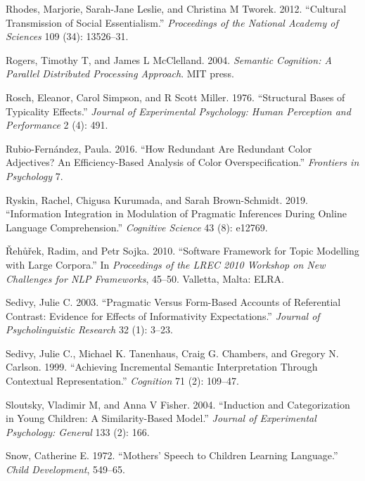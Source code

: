 \documentclass{ucetd}
\newlength{\cslhangindent}
\newenvironment{cslreferences}%
{\setlength{\parindent}{0pt}%
\everypar{\setlength{\hangindent}{\cslhangindent}}\ignorespaces}%
{\par}
\begin{document}
\begin{cslreferences}
\leavevmode\hypertarget{ref-rhodes2012}{}%
Rhodes, Marjorie, Sarah-Jane Leslie, and Christina M Tworek. 2012.
``Cultural Transmission of Social Essentialism.'' \emph{Proceedings of
the National Academy of Sciences} 109 (34): 13526--31.

\leavevmode\hypertarget{ref-rogers2004}{}%
Rogers, Timothy T, and James L McClelland. 2004. \emph{Semantic
Cognition: A Parallel Distributed Processing Approach}. MIT press.

\leavevmode\hypertarget{ref-rosch_structural_1976}{}%
Rosch, Eleanor, Carol Simpson, and R Scott Miller. 1976. ``Structural
Bases of Typicality Effects.'' \emph{Journal of Experimental Psychology:
Human Perception and Performance} 2 (4): 491.

\leavevmode\hypertarget{ref-rubio-fernandez_how_2016}{}%
Rubio-Fernández, Paula. 2016. ``How Redundant Are Redundant Color
Adjectives? An Efficiency-Based Analysis of Color Overspecification.''
\emph{Frontiers in Psychology} 7.

\leavevmode\hypertarget{ref-ryskin2019information}{}%
Ryskin, Rachel, Chigusa Kurumada, and Sarah Brown-Schmidt. 2019.
``Information Integration in Modulation of Pragmatic Inferences During
Online Language Comprehension.'' \emph{Cognitive Science} 43 (8):
e12769.

\leavevmode\hypertarget{ref-rehurek2010}{}%
Řehůřek, Radim, and Petr Sojka. 2010. ``Software Framework for Topic
Modelling with Large Corpora.'' In \emph{Proceedings of the LREC 2010
Workshop on New Challenges for NLP Frameworks}, 45--50. Valletta, Malta:
ELRA.

\leavevmode\hypertarget{ref-sedivy_pragmatic_2003}{}%
Sedivy, Julie C. 2003. ``Pragmatic Versus Form-Based Accounts of
Referential Contrast: Evidence for Effects of Informativity
Expectations.'' \emph{Journal of Psycholinguistic Research} 32 (1):
3--23.

\leavevmode\hypertarget{ref-sedivy_achieving_1999}{}%
Sedivy, Julie C., Michael K. Tanenhaus, Craig G. Chambers, and Gregory
N. Carlson. 1999. ``Achieving Incremental Semantic Interpretation
Through Contextual Representation.'' \emph{Cognition} 71 (2): 109--47.

\leavevmode\hypertarget{ref-sloutsky2004}{}%
Sloutsky, Vladimir M, and Anna V Fisher. 2004. ``Induction and
Categorization in Young Children: A Similarity-Based Model.''
\emph{Journal of Experimental Psychology: General} 133 (2): 166.

\leavevmode\hypertarget{ref-snow1972}{}%
Snow, Catherine E. 1972. ``Mothers' Speech to Children Learning
Language.'' \emph{Child Development}, 549--65.


\end{cslreferences}
\end{document}
